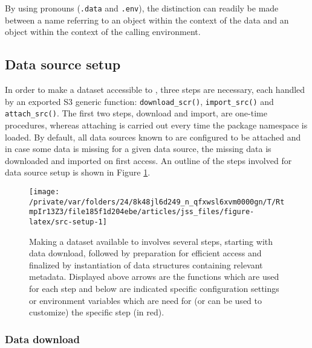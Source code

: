 \documentclass[
  notitle]{jss}
\begin{document}
By using  pronouns (\texttt{.data} and \texttt{.env}), the
distinction can readily be made between a name referring to an object
within the context of the data and an object within the context of the
calling environment.

\hypertarget{data-source-setup}{%
\subsection{Data source setup}\label{data-source-setup}}

In order to make a dataset accessible to , three steps are
necessary, each handled by an exported S3 generic function:
\texttt{download\_scr()}, \texttt{import\_src()} and
\texttt{attach\_src()}. The first two steps, download and import, are
one-time procedures, whereas attaching is carried out every time the
package namespace is loaded. By default, all data sources known to
 are configured to be attached and in case some data is
missing for a given data source, the missing data is downloaded and
imported on first access. An outline of the steps involved for data
source setup is shown in Figure \ref{fig:src-setup}.

\begin{CodeChunk}
\begin{figure}

{\centering \texttt{[image: /private/var/folders/24/8k48jl6d249\_n\_qfxwsl6xvm0000gn/T/RtmpIr13Z3/file185f1d204ebe/articles/jss\_files/figure-latex/src-setup-1]} 

}

\caption[Making a dataset available to  involves several steps, starting with data download, followed by preparation for efficient access and finalized by instantiation of data structures containing relevant metadata]{Making a dataset available to  involves several steps, starting with data download, followed by preparation for efficient access and finalized by instantiation of data structures containing relevant metadata. Displayed above arrows are the functions which are used for each step and below are indicated specific configuration settings or environment variables which are need for (or can be used to customize) the specific step (in red).}\label{fig:src-setup}
\end{figure}
\end{CodeChunk}

\hypertarget{data-download}{%
\subsubsection{Data download}\label{data-download}}
\end{document}
